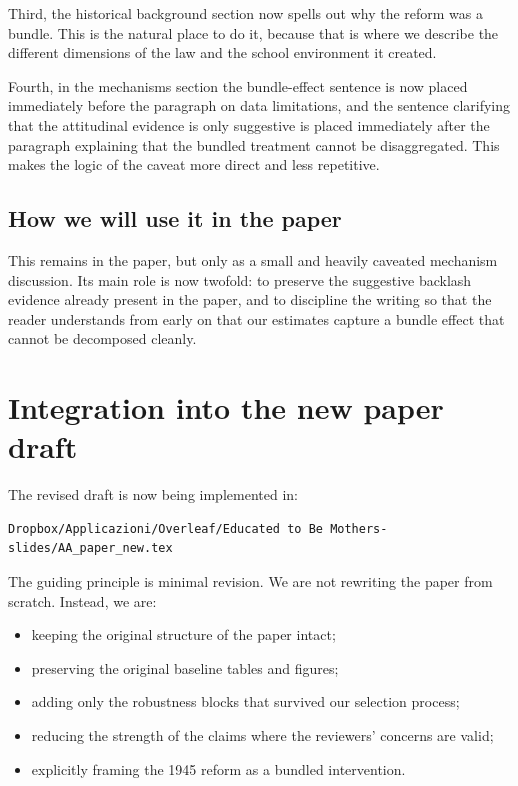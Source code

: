 \documentclass[11pt]{article}
\begin{document}
Third, the historical background section now spells out why the reform was a bundle. This is the natural place to do it, because that is where we describe the different dimensions of the law and the school environment it created.

Fourth, in the mechanisms section the bundle-effect sentence is now placed immediately before the paragraph on data limitations, and the sentence clarifying that the attitudinal evidence is only suggestive is placed immediately after the paragraph explaining that the bundled treatment cannot be disaggregated. This makes the logic of the caveat more direct and less repetitive.

\subsection*{How we will use it in the paper}

This remains in the paper, but only as a small and heavily caveated mechanism discussion. Its main role is now twofold: to preserve the suggestive backlash evidence already present in the paper, and to discipline the writing so that the reader understands from early on that our estimates capture a bundle effect that cannot be decomposed cleanly.

\section*{Integration into the new paper draft}

The revised draft is now being implemented in:

\begin{verbatim}
Dropbox/Applicazioni/Overleaf/Educated to Be Mothers-slides/AA_paper_new.tex
\end{verbatim}

The guiding principle is minimal revision. We are not rewriting the paper from scratch. Instead, we are:
\begin{itemize}[leftmargin=*]
\item keeping the original structure of the paper intact;
\item preserving the original baseline tables and figures;
\item adding only the robustness blocks that survived our selection process;
\item reducing the strength of the claims where the reviewers' concerns are valid;
\item explicitly framing the 1945 reform as a bundled intervention.
\end{itemize}
\end{document}

